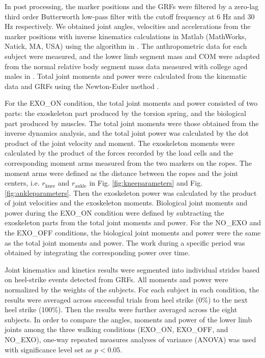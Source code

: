 \documentclass[twocolumn,cleanfoot,10pt]{asme2ej}
\begin{document}
In post processing, the marker positions and the GRFs were filtered by a zero-lag third order Butterworth low-pass filter with the cutoff frequency at 6 Hz and 30 Hz respectively.
We obtained joint angles, velocities and accelerations from the marker positions with inverse kinematics calculations in Matlab (MathWorks, Natick, MA, USA) using the algorithm in \cite{RN24}.
The anthropometric data for each subject were measured, and the lower limb segment mass and COM were adapted from the normal relative body segment mass data measured with college aged males in \cite{de1996adjustments}.
Total joint moments and power were calculated from the kinematic data and GRFs using the Newton-Euler method \cite{kane1985dynamics}.

For the EXO\_ON condition, the total joint moments and power consisted of two parts: the exoskeleton part produced by the torsion spring, and the biological part produced by muscles.
The total joint moments were those obtained from the inverse dynamics analysis, and the total joint power was calculated by the dot product of the joint velocity and moment.
The exoskeleton moments were calculated by the product of the forces recorded by the load cells and the corresponding moment arms measured from the two markers on the ropes.
The moment arms were defined as the distance between the ropes and the joint centers, i.e. $r_\mathrm{knee}$ and $r_\mathrm{ankle}$ in Fig. \ref{fig:kneeparameters} and Fig. \ref{fig:ankleparameters}.
Then the exoskeleton power was calculated by the product of joint velocities and the exoskeleton moments.
Biological joint moments and power during the EXO\_ON condition were defined by subtracting the exoskeleton parts from the total joint moments and power.
For the NO\_EXO and the EXO\_OFF conditions, the biological joint moments and power were the same as the total joint moments and power.
The work during a specific period was obtained by integrating the corresponding power over time.

Joint kinematics and kinetics results were segmented into individual strides based on heel-strike events detected from GRFs.
All moments and power were normalized by the weights of the subjects.
For each subject in each condition, the results were averaged across successful trials from heel strike (0\%) to the next heel strike (100\%).
Then the results were further averaged across the eight subjects.
In order to compare the angles, moments and power of the lower limb joints among the three walking conditions (EXO\_ON, EXO\_OFF, and NO\_EXO), one-way repeated measures analyses of variance (ANOVA) was used with significance level set as $p<0.05$.
\end{document}
